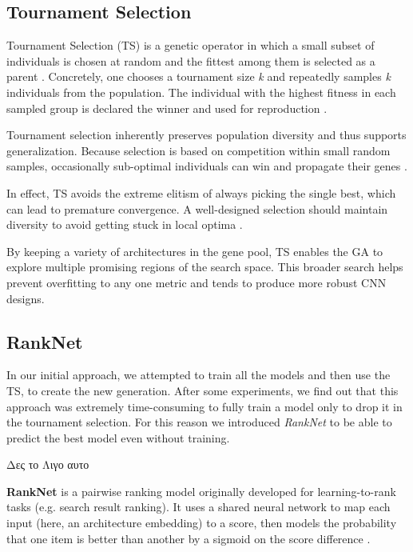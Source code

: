 \subsection{Tournament Selection}
Tournament Selection (TS) is a genetic operator in which a small subset of individuals is chosen at random and the fittest among them is selected as a parent \cite{hussain2020trade}. 
Concretely, one chooses a tournament size \textit{k} and repeatedly samples \textit{k} individuals from the population. The individual with the highest fitness in each sampled group is declared the winner and used for reproduction \cite{hussain2020trade}.

Tournament selection inherently preserves population diversity and thus supports generalization. Because selection is based on competition within small random samples, occasionally sub-optimal individuals can win and propagate their genes \cite{hussain2020trade}.

In effect, TS avoids the extreme elitism of always picking the single best, which can lead to premature convergence. A well-designed selection should maintain diversity to avoid getting stuck in local optima \cite{filipovic2003fine}.

By keeping a variety of architectures in the gene pool, TS enables the GA to explore multiple promising regions of the search space. This broader search helps prevent overfitting to any one metric and tends to produce more robust CNN designs.


\subsection{RankNet}

In our initial approach, we attempted to train all the models and then use the TS, to create the new generation. After some experiments, we find out that this approach was extremely time-consuming to fully train a model only to drop it in the tournament selection. For this reason we introduced \textit{RankNet} to be able to predict the best model even without training.

Δες το Λιγο αυτο

\textbf{RankNet} is a pairwise ranking model originally developed for learning-to-rank tasks (e.g. search result ranking). It uses a shared neural network to map each input (here, an architecture embedding) to a score, then models the probability that one item is better than another by a sigmoid on the score difference \cite{RankNet}.

